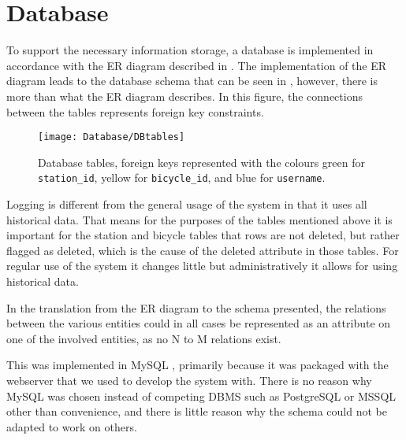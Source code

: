 \section{Database}
To support the necessary information storage, a database is implemented in accordance with the ER diagram described in .
The implementation of the ER diagram leads to the database schema that can be seen in , however, there is more than what the ER diagram describes.
In this figure, the connections between the tables represents foreign key constraints.

\begin{figure}[h]
	\centering
	\texttt{[image: Database/DBtables]}
	\caption{Database tables, foreign keys represented with the colours green for \texttt{station_id}, yellow for \texttt{bicycle_id}, and blue for \texttt{username}.}\label{fig:Database-tables}
\end{figure}

Logging is different from the general usage of the system in that it uses all historical data.
That means for the purposes of the tables mentioned above it is important for the station and bicycle tables that rows are not deleted, but rather flagged as deleted, which is the cause of the deleted attribute in those tables. 
For regular use of the system it changes little but administratively it allows for using historical data.

In the translation from the ER diagram to the schema presented, the relations between the various entities could in all cases be represented as an attribute on one of the involved entities, as no N to M relations exist.

This was implemented in MySQL \citep{misc:mysql}, primarily because it was packaged with the webserver that we used to develop the system with.
There is no reason why MySQL was chosen instead of competing DBMS such as PostgreSQL \citep{misc:postgres} or MSSQL \citep{misc:mssql} other than convenience, and there is little reason why the schema could not be adapted to work on others. 